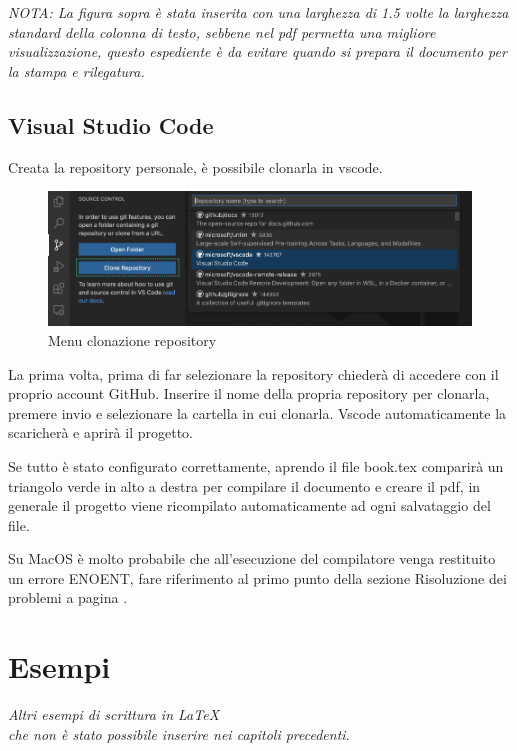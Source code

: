 \documentclass[envcountsame,envcountchap]{svmono}
\begin{document}
\textit{
NOTA: La figura sopra è stata inserita con una larghezza di 1.5 volte la larghezza
standard della colonna di testo, sebbene nel pdf permetta una migliore visualizzazione,
questo espediente è da evitare quando si prepara il documento per la stampa e rilegatura.}

\newpage \label{nuova_pagina}

\section{Visual Studio Code}
Creata la repository personale, è possibile clonarla in vscode. \citep{vscodeGit}
\begin{figure}[H]
    \centering
    \includegraphics[width=\linewidth]{images/vscode/vscode_clone_repo.png}
    \caption{Menu clonazione repository}
    \label{clonazione_repository}
\end{figure}
La prima volta, prima di far selezionare la repository chiederà di accedere con il 
proprio account GitHub. Inserire il nome della propria repository per clonarla, 
premere invio e selezionare la cartella in cui clonarla.
Vscode automaticamente la scaricherà e aprirà il progetto.

Se tutto è stato configurato correttamente, aprendo il file book.tex comparirà un 
triangolo verde in alto a destra per compilare il documento e creare il pdf, in generale 
il progetto viene ricompilato automaticamente ad ogni salvataggio del file.

Su MacOS è molto probabile che all'esecuzione del compilatore venga restituito un 
errore ENOENT, fare riferimento al primo punto della sezione Risoluzione dei problemi
a pagina \pageref{enoent}.



\chapter{Esempi}  \label{Cap.3}

\vspace{2cm}

\begin{flushright}
 \textit{Altri esempi di scrittura in \LaTeX\\ che non è stato possibile inserire nei capitoli precedenti.}
\end{flushright}
\end{document}
